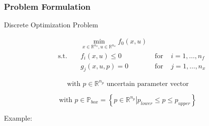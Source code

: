 

\begin{frame}
\frametitle{Problem Formulation}

\begin{block}{Discrete Optimization Problem}
	
\begin{align*}
 &&& \min_{x\in \mathbb{R}^{n_{x}}, u\in \mathbb{R}^{n_{u}}}  f_{0}(x, u)\\
& \text{ s.t. } &&  f_{i}(x,u) \leq 0 & \text{ for } & i=1,\ldots,n_{f}\\
&&&  g_{j}(x,u,p)=0 & \text{ for } & j=1,\ldots,n_{x}
\end{align*}
\begin{overprint}
\begin{equation*}
\text{with } p\in \mathbb{R}^{n_{p}} \text{ uncertain parameter vector}
\end{equation*}

\begin{equation*}
\text{with } p\in\mathbb{P}_{box}=\left\{\left. p\in\mathbb{R}^{n_{p}} \right| p_{lower}\leq p \leq p_{upper}\right\}
\end{equation*}
\end{overprint}
\end{block}


%
Example:

%




\end{frame}

